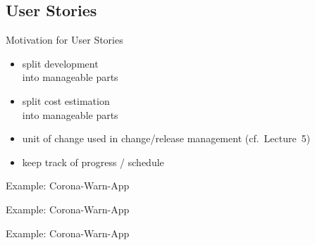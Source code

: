 \subsection{User Stories}
\begin{frame}{\insertsubsection}
	\begin{fancycolumns}
		\begin{note}{Motivation for User Stories}
			\begin{itemize}
				\item split development\\ into manageable parts
				\item split cost estimation\\ into manageable parts
				\item unit of change used in change/release management (cf.~Lecture~5)
				\item keep track of progress / schedule
			\end{itemize}
		\end{note}
		\nextcolumn
	\end{fancycolumns}
\end{frame}

\begin{frame}{\insertsubsection{} Example: Corona-Warn-App}
	\centering{}
\end{frame}
\begin{frame}{\insertsubsection{} Example: Corona-Warn-App}
	\centering{}
\end{frame}
\begin{frame}{\insertsubsection{} Example: Corona-Warn-App}
	\centering{}
\end{frame}


